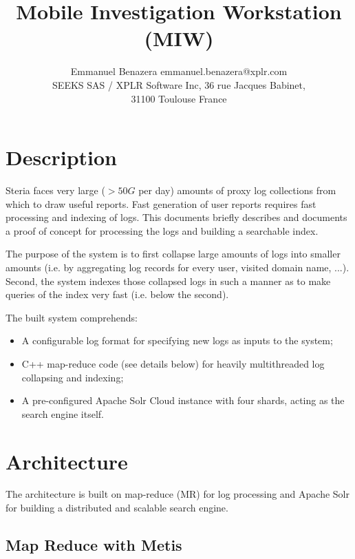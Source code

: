 \documentclass[twoside,11pt]{article}
\begin{document}
\title{Mobile Investigation Workstation (MIW)}

\author{\name Emmanuel Benazera \email emmanuel.benazera@xplr.com \\
        \addr SEEKS SAS / XPLR Software Inc, 36 rue Jacques Babinet,\\
        31100 Toulouse France}

\maketitle

\setlength{\parindent}{0pt} %

\section{Description}
Steria faces very large ($> 50G$ per day) amounts of proxy log collections from which to draw useful reports. Fast generation of user reports requires fast processing and indexing of logs. This documents briefly describes and documents a proof of concept for processing the logs and building a searchable index.

The purpose of the system is to first collapse large amounts of logs into smaller amounts (i.e. by aggregating log records for every user, visited domain name, ...). Second, the system indexes those collapsed logs in such a manner as to make queries of the index very fast (i.e. below the second).

The built system comprehends:
\begin{itemize}
\item A configurable log format for specifying new logs as inputs to the system;
\item C++ map-reduce code (see details below) for heavily multithreaded log collapsing and indexing;
\item A pre-configured Apache Solr Cloud instance with four shards, acting as the search engine itself.
\end{itemize}

\section{Architecture}
The architecture is built on map-reduce (MR) for log processing and Apache Solr for building a distributed and scalable search engine.

\subsection{Map Reduce with Metis}
\end{document}
